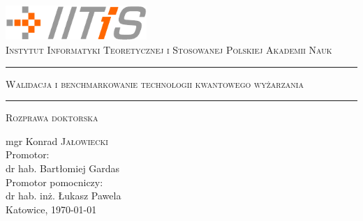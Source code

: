 \documentclass[11pt,dvipsnames,twoside,openright]{memoir}
\theoremstyle{definition}
\begin{document}
\begin{titlingpage}
  \begin{center}
    \includegraphics[width=0.4\textwidth]{figures/iitis_logo}\\
    \vspace{0.5em}
    \textsc{\large Instytut Informatyki Teoretycznej i Stosowanej Polskiej Akademii Nauk}
    \vspace*{1in}
    \hrule
    \vspace*{0.5em}
    \textsc{\huge Walidacja i benchmarkowanie technologii kwantowego wyżarzania}
    \vspace*{0.5em}
    \hrule
    \vspace*{1em}
    \textsc{\large Rozprawa doktorska}
    \par
    \vspace{1.5in}
    {\large mgr Konrad \textsc{Jałowiecki}}\\
    \vspace{0.25in}
    Promotor:\\ dr hab. Bartłomiej Gardas\\
    \vspace{0.25in}
    Promotor pomocniczy:\\ dr hab. inż. Łukasz Pawela\\
    \vfill
    {Katowice, \today}
  \end{center}
\end{titlingpage}

\frontmatter

\tableofcontents*
\newpage





\mainmatter










{
  \small
  \printbibliography
}
\appendix

\end{document}
